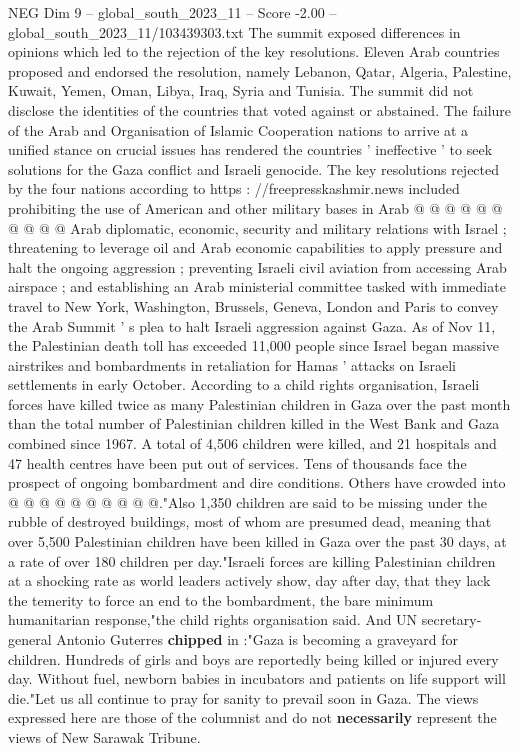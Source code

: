 \begin{textsample}{NEG Dim 9 – global\_south\_2023\_11 – Score -2.00 – global\_south\_2023\_11/103439303.txt}
The summit exposed differences in opinions which led to the rejection of the key resolutions.
Eleven Arab countries proposed and endorsed the resolution, namely Lebanon, Qatar, Algeria, Palestine, Kuwait, Yemen, Oman, Libya, Iraq, Syria and Tunisia.
The summit did not disclose the identities of the countries that voted against or abstained.
The failure of the Arab and Organisation of Islamic Cooperation nations to arrive at a unified stance on crucial issues has rendered the countries ' ineffective ' to seek solutions for the Gaza conflict and Israeli genocide.
The key resolutions rejected by the four nations according to https : //freepresskashmir.news included prohibiting the use of American and other military bases in Arab @ @ @ @ @ @ @ @ @ @ Arab diplomatic, economic, security and military relations with Israel ; threatening to leverage oil and Arab economic capabilities to apply pressure and halt the ongoing aggression ; preventing Israeli civil aviation from accessing Arab airspace ; and establishing an Arab ministerial committee tasked with immediate travel to New York, Washington, Brussels, Geneva, London and Paris to convey the Arab Summit ' s plea to halt Israeli aggression against Gaza.
As of Nov 11, the Palestinian death toll has exceeded 11,000 people since Israel began massive airstrikes and bombardments in retaliation for Hamas ' attacks on Israeli settlements in early October.
According to a child rights organisation, Israeli forces have killed twice as many Palestinian children in Gaza over the past month than the total number of Palestinian children killed in the West Bank and Gaza combined since 1967.
A total of 4,506 children were killed, and 21 hospitals and 47 health centres have been put out of services.
Tens of thousands face the prospect of ongoing bombardment and dire conditions.
Others have crowded into @ @ @ @ @ @ @ @ @ @."Also 1,350 children are said to be missing under the rubble of destroyed buildings, most of whom are presumed dead, meaning that over 5,500 Palestinian children have been killed in Gaza over the past 30 days, at a rate of over 180 children per day."Israeli forces are killing Palestinian children at a shocking rate as world leaders actively show, day after day, that they lack the temerity to force an end to the bombardment, the bare minimum humanitarian response,"the child rights organisation said.
And UN secretary-general Antonio Guterres \textbf{chipped} in :"Gaza is becoming a graveyard for children.
Hundreds of girls and boys are reportedly being killed or injured every day.
Without fuel, newborn babies in incubators and patients on life support will die."Let us all continue to pray for sanity to prevail soon in Gaza.
The views expressed here are those of the columnist and do not \textbf{necessarily} represent the views of New Sarawak Tribune.

\end{textsample}
